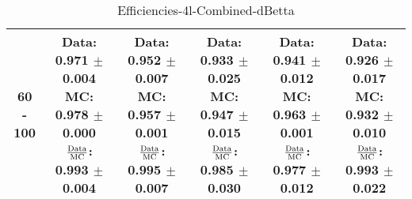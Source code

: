 \documentclass[final,letterpaper,twoside,12pt]{article}
\begin{document}
\begin{table}[htbp]
\begin{adjustwidth}{-4em}{-4em}
\begin{tabular}{|c|c|c|c|c|c|}
60 - 100 & \parbox[c]{1.1 in}{ \scriptsize  Data: 0.971 $\pm$ 0.004 \newline MC: 0.978 $\pm$ 0.000 \newline $\frac{\rm{Data}}{\rm{MC}}$: 0.993 $\pm$ 0.004} & \parbox[c]{1.1 in}{ \scriptsize  Data: 0.952 $\pm$ 0.007 \newline MC: 0.957 $\pm$ 0.001 \newline $\frac{\rm{Data}}{\rm{MC}}$: 0.995 $\pm$ 0.007} & \parbox[c]{1.1 in}{ \scriptsize  Data: 0.933 $\pm$ 0.025 \newline MC: 0.947 $\pm$ 0.015 \newline $\frac{\rm{Data}}{\rm{MC}}$: 0.985 $\pm$ 0.030} & \parbox[c]{1.1 in}{ \scriptsize  Data: 0.941 $\pm$ 0.012 \newline MC: 0.963 $\pm$ 0.001 \newline $\frac{\rm{Data}}{\rm{MC}}$: 0.977 $\pm$ 0.012} & \parbox[c]{1.1 in}{ \scriptsize  Data: 0.926 $\pm$ 0.017 \newline MC: 0.932 $\pm$ 0.010 \newline $\frac{\rm{Data}}{\rm{MC}}$: 0.993 $\pm$ 0.022}\\ \hline 
\end{tabular}
\caption {Efficiencies-4l-Combined-dBetta}
\label{tab:cqdata0}
\end{adjustwidth}\end{table}
\end{document}
